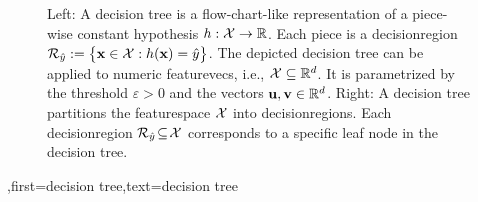 {{\begin{figure}[H]
\begin{minipage}{.45\textwidth}
\end{minipage}
	\caption{Left: A decision tree is a flow-chart-like representation of a piece-wise constant \gls{hypothesis} $h: \mathcal{X} \rightarrow \mathbb{R}$.  Each piece is a \gls{decisionregion} $\mathcal{R}_{\hat{y}} := \big\{ {\bf x} \in  \mathcal{X}: h({\bf x}) = \hat{y} \big\}$. 
		The depicted decision tree can be applied to numeric \gls{featurevec}s, i.e., $\mathcal{X} \subseteq \mathbb{R}^{d}$. It is  parametrized by the threshold $\varepsilon>0$ and the vectors ${\bf u}, {\bf v} \in \mathbb{R}^{d}$. 
		Right: A decision tree partitions  
		the \gls{featurespace} $\mathcal{X}$ into \gls{decisionregion}s. Each \gls{decisionregion}  
		$\mathcal{R}_{\hat{y}} \!\subseteq\!\mathcal{X}$ corresponds to a specific leaf node in the decision tree.}
	\label{fig_decision_tree}
\end{figure} 
	  }
	  ,first={decision tree},text={decision tree} }



